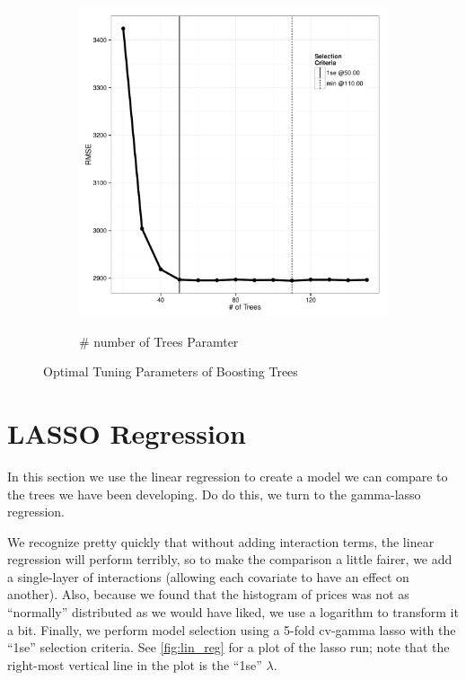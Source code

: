 \documentclass[11pt, fleqn]{article}
\begin{document}
\begin{figure}
\begin{subfigure}[b]{0.44\textwidth}
    \label{fig:gbm_indepth}
  \end{subfigure}
  \hfill
  \begin{subfigure}[b]{0.44\textwidth}
    \caption{\# number of Trees Paramter}
    \includegraphics[width=\textwidth]{gbm_ntree.pdf}
    \label{fig:gbm_ntree}
  \end{subfigure}
  \caption{Optimal Tuning Parameters of Boosting Trees}
\end{figure}

\section{LASSO Regression}
In this section we use the linear regression to create a model we can compare to the trees we have been developing.  Do do this, we turn to the gamma-lasso regression.

We recognize pretty quickly that without adding interaction terms, the linear regression will perform terribly, so to make the comparison a little fairer, we add a single-layer of interactions (allowing each covariate to have an effect on another).  Also, because we found that the histogram of prices was not as ``normally'' distributed as we would have liked, we use a logarithm to transform it a bit.  Finally, we perform model selection using a 5-fold cv-gamma lasso with the ``1se'' selection criteria.  See \cref{fig:lin_reg} for a plot of the lasso run; note that the right-most vertical line in the plot is the ``1se'' $\lambda$.
\end{document}
